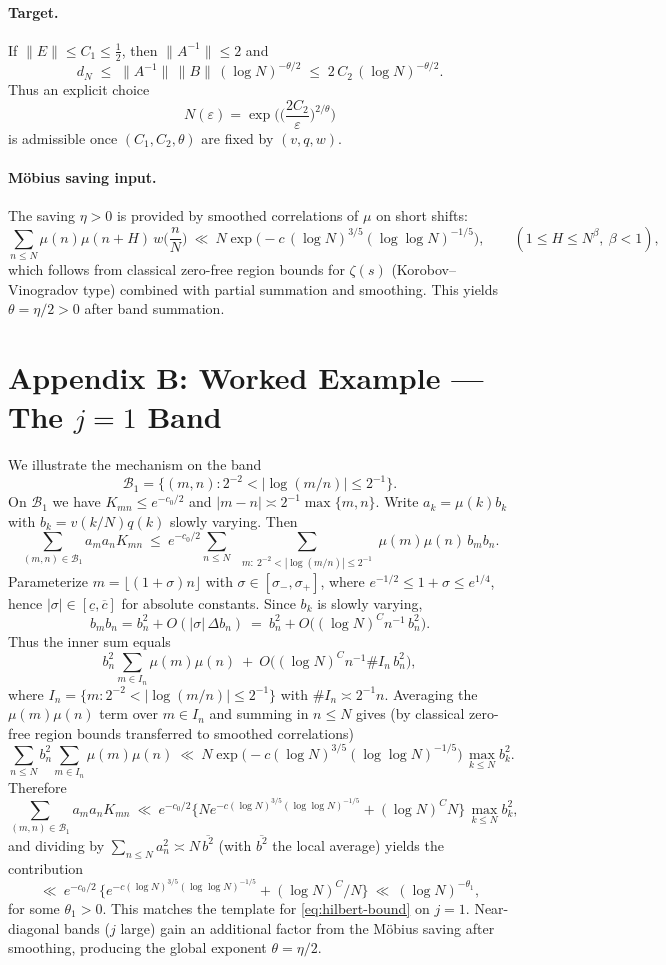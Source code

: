 \documentclass[11pt]{article}
\theoremstyle{remark}
\begin{document}
\paragraph{Target.}
If $\|E\|\le C_1\le \tfrac12$, then $\|A^{-1}\|\le 2$ and
\[
d_N \;\le\; \|A^{-1}\|\,\|B\|\,(\log N)^{-\theta/2}
\;\le\; 2\,C_2\,(\log N)^{-\theta/2}.
\]
Thus an explicit choice
\[
N(\varepsilon)=\exp\!\Big(\Big(\frac{2C_2}{\varepsilon}\Big)^{2/\theta}\Big)
\]
is admissible once $(C_1,C_2,\theta)$ are fixed by $(v,q,w)$.

\paragraph{M\"obius saving input.}
The saving $\eta>0$ is provided by smoothed correlations of $\mu$ on short shifts:
\[
\sum_{n\le N}\mu(n)\mu(n+H)\,w\!\Big(\frac{n}{N}\Big)
\ \ll\ N\exp\!\Big(-c\,(\log N)^{3/5}(\log\log N)^{-1/5}\Big),
\qquad (1\le H\le N^{\beta},\ \beta<1),
\]
which follows from classical zero-free region bounds for $\zeta(s)$ (Korobov--Vinogradov type) combined with partial summation and smoothing. This yields $\theta=\eta/2>0$ after band summation.

\section*{Appendix B: Worked Example --- The $j=1$ Band}
We illustrate the mechanism on the band
\[
\mathcal{B}_1=\{(m,n): 2^{-2}<|\log(m/n)|\le 2^{-1}\}.
\]
On $\mathcal{B}_1$ we have $K_{mn}\le e^{-c_0/2}$ and $|m-n|\asymp 2^{-1}\max\{m,n\}$.
Write $a_k=\mu(k) b_k$ with $b_k=v(k/N)q(k)$ slowly varying. Then
\[
\sum_{(m,n)\in \mathcal{B}_1} a_ma_nK_{mn}
\ \le\ e^{-c_0/2}\!\!\sum_{n\le N}\ \sum_{\substack{m:\ 2^{-2}<|\log(m/n)|\le 2^{-1}}}\!\!\mu(m)\mu(n)\,b_mb_n.
\]
Parameterize $m=\lfloor (1+\sigma)n\rfloor$ with $\sigma\in[\sigma_-,\sigma_+]$, where $e^{-1/2}\le 1+\sigma \le e^{1/4}$, hence $|\sigma|\in[ \underline{c}, \overline{c}]$ for absolute constants. Since $b_k$ is slowly varying,
\[
b_m b_n = b_n^2 + O(|\sigma|\,\Delta b_n)\ =\ b_n^2 + O\!\big((\log N)^C n^{-1}\,b_n^2\big).
\]
Thus the inner sum equals
\[
b_n^2 \sum_{m\in I_n}\mu(m)\mu(n) \ +\ O\!\big((\log N)^C n^{-1} \#I_n \, b_n^2\big),
\]
where $I_n=\{m:2^{-2}<|\log(m/n)|\le 2^{-1}\}$ with $\#I_n\asymp 2^{-1}n$.
Averaging the $\mu(m)\mu(n)$ term over $m\in I_n$ and summing in $n\le N$ gives (by classical zero-free region bounds transferred to smoothed correlations)
\[
\sum_{n\le N} b_n^2 \sum_{m\in I_n}\mu(m)\mu(n)
\ \ll\ N \exp\!\Big(-c(\log N)^{3/5}(\log\log N)^{-1/5}\Big)\,\max_{k\le N} b_k^2.
\]
Therefore
\[
\sum_{(m,n)\in \mathcal{B}_1} a_ma_nK_{mn}
\ \ll\ e^{-c_0/2}\Big\{ N e^{-c(\log N)^{3/5}(\log\log N)^{-1/5}} + (\log N)^C N \Big\}\,\max_{k\le N} b_k^2,
\]
and dividing by $\sum_{n\le N} a_n^2 \asymp N \,\overline{b^2}$ (with $\overline{b^2}$ the local average) yields the contribution
\[
\ll\ e^{-c_0/2}\,\Big\{e^{-c(\log N)^{3/5}(\log\log N)^{-1/5}}+(\log N)^C/N\Big\}
\ \ll\ (\log N)^{-\theta_1},
\]
for some $\theta_1>0$. This matches the template for \eqref{eq:hilbert-bound} on $j=1$. Near-diagonal bands ($j$ large) gain an additional factor from the M\"obius saving after smoothing, producing the global exponent $\theta=\eta/2$.
\end{document}
